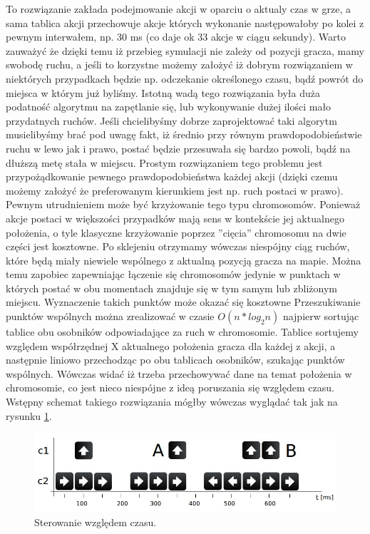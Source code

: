\begin{par}
\begin{enumerate}
\begin{par}
		To rozwiązanie zakłada podejmowanie akcji w oparciu o aktualy czas w grze, a sama tablica akcji przechowuje akcje których wykonanie następowałoby po kolei z pewnym interwałem, np. 30 ms (co daje ok 33 akcje w ciągu sekundy).
		Warto zauważyć że dzięki temu iż przebieg symulacji nie zależy od pozycji gracza, mamy swobodę ruchu, a jeśli to korzystne możemy założyć iż dobrym rozwiązaniem w niektórych przypadkach będzie np. odczekanie określonego czasu, bądź powrót do miejsca w którym już byliśmy.
		Istotną wadą tego rozwiązania była duża podatność algorytmu na zapętlanie się, lub wykonywanie dużej ilości mało przydatnych ruchów. 
		Jeśli chcielibyśmy dobrze zaprojektować taki algorytm musielibyśmy brać pod uwagę fakt, iż średnio przy równym prawdopodobieństwie ruchu w lewo jak i prawo, postać będzie przesuwała się bardzo powoli, bądź na dłuższą metę stała w miejscu. Prostym rozwiązaniem tego problemu jest przypożądkowanie pewnego prawdopodobieństwa każdej akcji (dzięki czemu możemy założyć że preferowanym kierunkiem jest np. ruch postaci w prawo).
		Pewnym utrudnieniem może być krzyżowanie tego typu chromosomów. Ponieważ akcje postaci w większości przypadków mają sens w kontekście jej aktualnego położenia, o tyle klasyczne krzyżowanie poprzez ''cięcia'' chromosomu na dwie części jest kosztowne.
		Po sklejeniu otrzymamy wówczas niespójny ciąg ruchów, które będą miały niewiele wspólnego z aktualną pozycją gracza na mapie.
		Można temu zapobiec zapewniając łączenie się chromosomów jedynie w punktach w których postać w obu momentach znajduje się w tym samym lub zbliżonym miejscu. Wyznaczenie takich punktów może okazać się kosztowne
		Przeszukiwanie punktów wspólnych można zrealizować w czasie $O(n*log_2n)$ najpierw sortując tablice obu osobników odpowiadające za ruch w chromosomie. 
		Tablice sortujemy względem współrzędnej X aktualnego położenia gracza dla każdej z akcji, a następnie liniowo przechodząc po obu tablicach osobników, szukając punktów wspólnych.
		Wówczas widać iż trzeba przechowywać dane na temat położenia w chromosomie, co jest nieco niespójne z ideą poruszania się względem czasu.
		Wstępny schemat takiego rozwiązania mógłby wówczas wyglądać tak jak na rysunku \ref{fig:sterowanie}.
		
		\begin{par}
		\begin{figure}[!h]
		\centering
		\includegraphics[width=\textwidth]{obrazki/sterowanie.jpg}
		\caption{Sterowanie względem czasu.}
		\label{fig:sterowanie}
		\end{figure}
		\end{par}
		

\end{par}
\end{enumerate}
\end{par}
